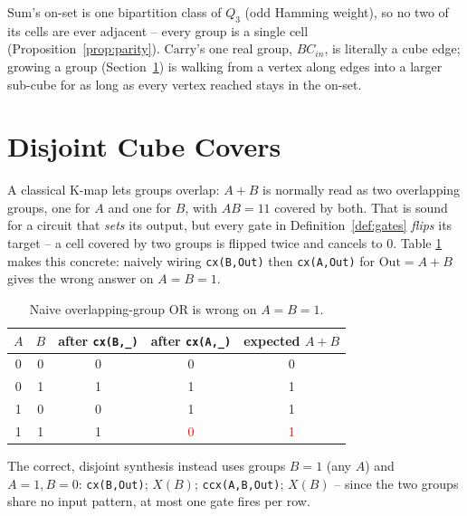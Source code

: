 \documentclass[conference]{IEEEtran}
\newcommand{\code}[1]{\texttt{#1}}
\theoremstyle{plain}
\begin{document}
$\mathrm{Sum}$'s on-set is one bipartition class of $Q_3$ (odd Hamming
weight), so no two of its cells are ever adjacent -- every group is a
single cell (Proposition~\ref{prop:parity}). $\mathrm{Carry}$'s one real
group, $BC_{in}$, is literally a cube edge; growing a group
(Section~\ref{sec:disjoint}) is walking from a vertex along edges into a
larger sub-cube for as long as every vertex reached stays in the on-set.

\section{Disjoint Cube Covers}
\label{sec:disjoint}

A classical K-map lets groups overlap: $A+B$ is normally read as two
overlapping groups, one for $A$ and one for $B$, with $AB=11$ covered by
both. That is sound for a circuit that \emph{sets} its output, but every
gate in Definition~\ref{def:gates} \emph{flips} its target -- a cell
covered by two groups is flipped twice and cancels to $0$. Table
\ref{tab:orbug} makes this concrete: naively wiring \code{cx(B,Out)} then
\code{cx(A,Out)} for $\mathrm{Out}=A+B$ gives the wrong answer on
$A{=}B{=}1$.

\begin{table}[t]
\centering
\caption{Naive overlapping-group OR is wrong on $A{=}B{=}1$.}
\label{tab:orbug}
\begin{tabular}{cc|cc|c}
\toprule
$A$&$B$& after \code{cx(B,\_)} & after \code{cx(A,\_)} & expected $A{+}B$\\
\midrule
0&0&0&0&0\\
0&1&1&1&1\\
1&0&0&1&1\\
1&1&1&\textcolor{red}{0}&\textcolor{red}{1}\\
\bottomrule
\end{tabular}
\end{table}

The correct, disjoint synthesis instead uses groups $B{=}1$ (any $A$) and
$A{=}1,B{=}0$: \code{cx(B,Out)}; $X(B)$; \code{ccx(A,B,Out)}; $X(B)$ --
since the two groups share no input pattern, at most one gate fires per
row.
\end{document}
